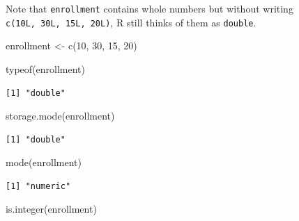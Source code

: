 \documentclass[
  letterpaper,
  DIV=11,
  numbers=noendperiod]{scrreprt}
\newenvironment{Shaded}{\begin{snugshade}}{\end{snugshade}}
\newcommand{\DecValTok}[1]{\textcolor[rgb]{0.68,0.00,0.00}{#1}}
\newcommand{\FunctionTok}[1]{\textcolor[rgb]{0.28,0.35,0.67}{#1}}
\newcommand{\NormalTok}[1]{\textcolor[rgb]{0.00,0.23,0.31}{#1}}
\newcommand{\OtherTok}[1]{\textcolor[rgb]{0.00,0.23,0.31}{#1}}
\begin{document}
\begin{tcolorbox}[enhanced jigsaw, colbacktitle=quarto-callout-tip-color!10!white, opacitybacktitle=0.6, breakable, left=2mm, leftrule=.75mm, toprule=.15mm, toptitle=1mm, bottomtitle=1mm, colframe=quarto-callout-tip-color-frame, opacityback=0, coltitle=black, arc=.35mm, titlerule=0mm, colback=white, bottomrule=.15mm, title=\textcolor{quarto-callout-tip-color}{\faLightbulb}\hspace{0.5em}{Answer}, rightrule=.15mm]

Note that \texttt{enrollment} contains whole numbers but without writing
\texttt{c(10L,\ 30L,\ 15L,\ 20L)}, R still thinks of them as
\texttt{double}.

\begin{Shaded}
\begin{Highlighting}[]
\NormalTok{enrollment }\OtherTok{\textless{}{-}} \FunctionTok{c}\NormalTok{(}\DecValTok{10}\NormalTok{, }\DecValTok{30}\NormalTok{, }\DecValTok{15}\NormalTok{, }\DecValTok{20}\NormalTok{)}

\FunctionTok{typeof}\NormalTok{(enrollment)}
\end{Highlighting}
\end{Shaded}

\begin{verbatim}
[1] "double"
\end{verbatim}

\begin{Shaded}
\begin{Highlighting}[]
\FunctionTok{storage.mode}\NormalTok{(enrollment)}
\end{Highlighting}
\end{Shaded}

\begin{verbatim}
[1] "double"
\end{verbatim}

\begin{Shaded}
\begin{Highlighting}[]
\FunctionTok{mode}\NormalTok{(enrollment)}
\end{Highlighting}
\end{Shaded}

\begin{verbatim}
[1] "numeric"
\end{verbatim}

\begin{Shaded}
\begin{Highlighting}[]
\FunctionTok{is.integer}\NormalTok{(enrollment)}
\end{Highlighting}
\end{Shaded}


\end{tcolorbox}
\end{document}
